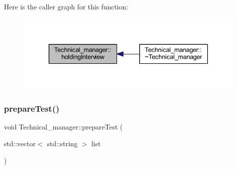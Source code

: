 Here is the caller graph for this function\+:
\nopagebreak
\begin{figure}[H]
\begin{center}
\leavevmode
\includegraphics[width=330pt]{class_technical__manager_a3e52c05a672894682cf2d4ab69664c1e_icgraph}
\end{center}
\end{figure}
\hypertarget{class_technical__manager_aba0df90b5aa9389fd90816fe4652c2ad}{}\label{class_technical__manager_aba0df90b5aa9389fd90816fe4652c2ad} 
\subsubsection{\texorpdfstring{prepare\+Test()}{prepareTest()}}
{\footnotesize\ttfamily void Technical\+\_\+manager\+::prepare\+Test (\begin{DoxyParamCaption}\item[{std\+::vector$<$ std\+::string $>$}]{list }\end{DoxyParamCaption})}

